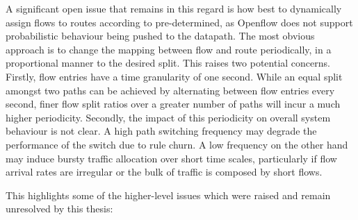 A significant open issue that remains in this regard is how best to dynamically assign flows to routes according to pre-determined, as Openflow does not support probabilistic behaviour being pushed to the datapath.
The most obvious approach is to change the mapping between flow and route periodically, in a proportional manner to the desired split.
This raises two potential concerns.
Firstly, flow entries have a time granularity of one second.
While an equal split amongst two paths can be achieved by alternating between flow entries every second, finer flow split ratios over a greater number of paths will incur a much higher periodicity.
Secondly, the impact of this periodicity on overall system behaviour is not clear.
A high path switching frequency may degrade the performance of the switch due to rule churn.
A low frequency on the other hand may induce bursty traffic allocation over short time scales, particularly if flow arrival rates are irregular or the bulk of traffic is composed by short flows.

This highlights some of the higher-level issues which were raised and remain unresolved by this thesis:

